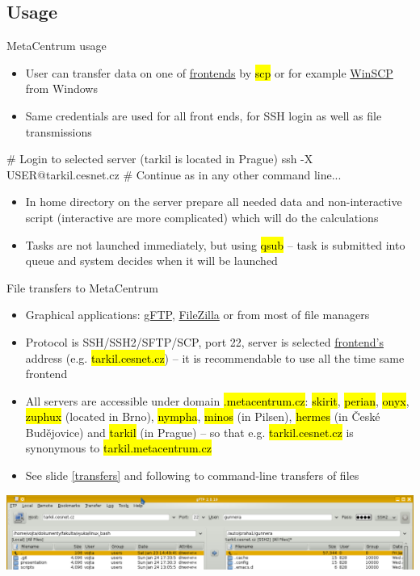 \documentclass[compress, ucs, xelatex, 11pt, xcolor=svgnames,
  hyperref={
    bookmarks=true,
    unicode=true,
    colorlinks=true,
    pdftitle={Linux, command line and MetaCentrum},
    plainpages=false,
    pdfauthor={Vojtech Zeisek},
    pdfsubject={Course about use of Linux command line, writing shell scripts and using MetaCentrum of CESNET},
    pdfcreator={XeLaTeX},
    pdfkeywords={Linux, GNU, BASH, shell, command line, MetaCentrum},
    linkcolor=Red,
    anchorcolor=Blue,
    citecolor=Purple,
    filecolor=DodgerBlue,
    menucolor=DarkOrchid,
    urlcolor=DeepSkyBlue,
    pdftex},
  url={hyphens, lowtilde} %
  ]{beamer}
\renewcommand{\texttt}[1]{\hl{\ttfamily #1}}
\begin{document}
\subsection{Usage}

\begin{frame}[fragile]{MetaCentrum usage}
  \begin{itemize}
    \item User can transfer data on one of \href{https://wiki.metacentrum.cz/wiki/Frontend}{frontends} by \texttt{scp} or for example \href{https://winscp.net/}{WinSCP} from Windows
    \item Same credentials are used for all front ends, for SSH login as well as file transmissions
  \end{itemize}
  \begin{bashcode}
    # Login to selected server (tarkil is located in Prague)
    ssh -X USER@tarkil.cesnet.cz
    # Continue as in any other command line...
  \end{bashcode}
  \begin{itemize}
    \item In home directory on the server prepare all needed data and non-interactive script (interactive are more complicated) which will do the calculations
    \item Tasks are not launched immediately, but using \texttt{qsub} -- task is submitted into queue and system decides when it will be launched
  \end{itemize}
\end{frame}

\begin{frame}{File transfers to MetaCentrum}
  \begin{itemize}
    \item Graphical applications: \href{http://gftp.org/}{gFTP}, \href{https://filezilla-project.org/}{FileZilla} or from most of file managers
    \item Protocol is SSH/SSH2/SFTP/SCP, port 22, server is selected \href{https://wiki.metacentrum.cz/wiki/Frontend}{frontend's} address (e.g. \texttt{tarkil.cesnet.cz}) -- it is recommendable to use all the time same frontend
    \item All servers are accessible under domain \texttt{*.metacentrum.cz}: \texttt{skirit}, \texttt{perian}, \texttt{onyx}, \texttt{zuphux} (located in Brno), \texttt{nympha}, \texttt{minos} (in Pilsen), \texttt{hermes} (in České Budějovice) and \texttt{tarkil} (in Prague) -- so that e.g. \texttt{tarkil.cesnet.cz} is synonymous to \texttt{tarkil.metacentrum.cz}
    \item See slide \ref{transfers} and following to command-line transfers of files
  \end{itemize}
  \includegraphics[width=\textwidth]{gftp.png}
\end{frame}
\end{document}
